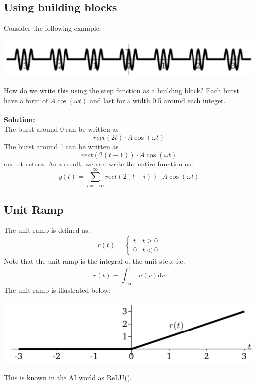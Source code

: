 \documentclass[10pt]{article}
\begin{document}
\subsection*{Using building blocks}
Consider the following example:
\begin{center}
    \includegraphics[scale=0.8]{W2_2.png}
\end{center}
How do we write this using the step function as a building block?  Each burst have a form of $A \cos(\omega t)$ and last for a width 0.5 around each integer.\\\\
\textbf{Solution:\\}
The burst around 0 can be written as 
\[rect(2t) \cdot A \cos(\omega t)\]
The burst around 1 can be written as
\[rect(2(t - 1)) \cdot A \cos(\omega t)\]
and et cetera.  As a result, we can write the entire function as:
\[y(t) = \sum_{i = -\infty}^{\infty} rect(2(t - i)) \cdot A\cos(\omega t)\]
\subsection*{Unit Ramp}
The unit ramp is defined as:
\[r(t) = \begin{cases}t & t \geq 0 \\ 0 & t < 0 \end{cases}\]
Note that the unit ramp is the integral of the unit step, i.e.
\[r(t) = \int_{-\infty}^t u(r) \text{d}r\]
The unit ramp is illustrated below:
\begin{center}
    \includegraphics[scale=0.8]{W2_3.png}
\end{center}
This is known in the AI world as ReLU().
\end{document}

